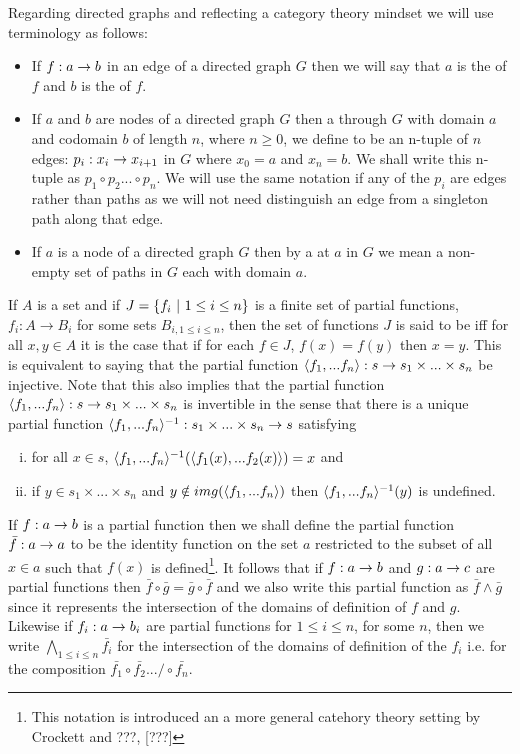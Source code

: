 Regarding directed graphs and reflecting a category theory mindset we will use terminology as follows:
\begin{itemize}
\item
 If $f: a \rightarrow b$ in an edge of a directed graph $G$ then we will say that $a$ is the  of $f$ and $b$ is the  of $f$.
\item
If $a$ and $b$ are nodes of a directed graph $G$ then a  through $G$ with domain $a$ and 
codomain $b$ of length $n$, where $n \geq 0$, we define to be  an n-tuple of  $n$ edges: $p_i: x_i \rightarrow x_{i+1} $ in $G$ where $x_0=a$ and $x_n=b$. We shall write this n-tuple as $p_1 \circ p_2... \circ p_n$. 
We will use the same notation if any of the $p_i$ are edges rather than paths as we will not need distinguish  an edge from a singleton path along that edge. 
\item
If $a$ is a node of a directed graph $G$ then by a  at $a$ in $G$ we mean a non-empty set of paths in $G$ each with domain $a$.
\end{itemize}

If $A$ is a set and if $J= \left\{f_i \ \middle|\  1\leq i \leq n\right\}$ is a finite set of partial functions, $f_i: A \rightarrow B_i$   for some sets $B_{i, 1 \leq i \leq n}$,  then the set of functions 
$J$ is said to be  iff for all $x,y \in A$ it is the case that  if  for each 
$f \in J$, $f(x)=f(y)$ then $x=y$. 
This  is equivalent to saying that  the partial function $\langle f_1,...f_n\rangle: s \rightarrow s_1 \times ... \times s_n $ be injective. Note that this also implies that the partial function $\langle f_1,...f_n\rangle: s \rightarrow s_1 \times ... \times s_n $ is invertible in the sense that there is a unique partial function $\langle f_1,...f_n\rangle^{-1} : s_1 \times ... \times s_n \rightarrow s$ satisfying
\begin{enumerate} [(i)]
\item for all $x \in s$, $\langle f_1,...f_n\rangle^{-1}(\langle f_1(x),...f_2(x) \rangle ) = x$ and 
\item  if $y \in s_1 \times ... \times s_n $ and
$y \notin img(\langle f_1,...f_n\rangle)$ then $\langle f_1,...f_n\rangle^{-1}(y)$ is undefined. 
\end{enumerate}

If $f: a \rightarrow b$ is a partial function then we shall define the partial function $\bar{f}: a \rightarrow a$ to be the identity function on the set $a$
restricted to the subset of all $x \in a$ such that $f(x)$ is defined\footnote{
This notation is introduced an a more general catehory theory setting by Crockett and ???, [???]}. It follows that if $f: a \rightarrow b$ and $g: a \rightarrow c$ are partial functions
then $\bar{f} \circ \bar{g} = \bar{g} \circ \bar{f}$ and we also write this partial function as $\bar{f} \wedge \bar{g}$ since it represents the intersection
of the domains of definition of $f$ and $g$. Likewise if $f_i:a \rightarrow b_i$ are partial functions for $1 \leq i \leq n$, for some $n$, then we write $\bigwedge\limits_{1 \leq i \leq n}{\bar{f_i}}$ for the intersection of the domains of definition of the $f_i$ i.e. for the composition
$\bar{f_1}\circ \bar{f_2} .../ \circ \bar{f_n}$.

